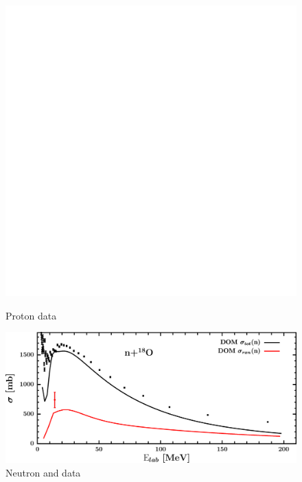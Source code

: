 \begin{figure}[H]
    \centering
    \begin{minipage}{0.45\textwidth}
        \centering
        \includegraphics[width=1.0\textwidth]{figures/o18_protonInelastic.png}
        \caption{Proton \rxn data}
        \label{DOMFitData_o18_proton_inelastic}
    \end{minipage}\hfill
    \begin{minipage}{0.45\textwidth}
        \centering
        \includegraphics[width=1.0\textwidth]{figures/o18_neutronInelastic.png}
        \caption{Neutron \rxn and \tot data}
        \label{DOMFitData_o18_neutron_inelastic}
    \end{minipage}
\end{figure}

